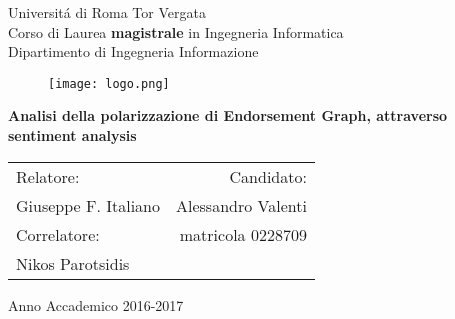 \thispagestyle{empty}
\vspace{-1.5cm} \bfseries{
\begin{center}
  \large
  Universit\'a di Roma Tor Vergata\\
  \normalsize
  Corso di Laurea \textbf{magistrale} in Ingegneria Informatica\\
  Dipartimento di Ingegneria Informazione\\
 
\vspace{0.5cm}
  \begin{figure}[htbp]
    \begin{center}
      \texttt{[image: logo.png]}
    \end{center}
  \end{figure}
  \vspace{0.5cm} \Large
 
  \textbf{Analisi della polarizzazione di Endorsement Graph, attraverso sentiment analysis}\\

  \vspace{.75cm} \large
\end{center}

\vspace{1.5cm} \large


\begin{tabularx}{\textwidth}{XR}
Relatore: & Candidato:\\
Giuseppe F. Italiano & Alessandro Valenti\\
Correlatore: & matricola 0228709\\
Nikos Parotsidis &\\
\end{tabularx}














\vspace{1.5cm}
\begin{center}



  Anno Accademico 2016-2017
\end{center} \clearpage
}
